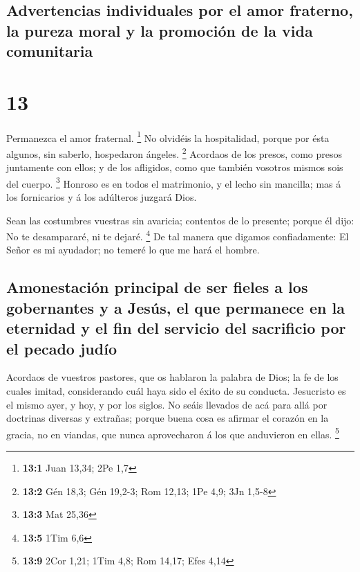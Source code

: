 \hypertarget{advertencias-individuales-por-el-amor-fraterno-la-pureza-moral-y-la-promociuxf3n-de-la-vida-comunitaria}{%
\subsection{Advertencias individuales por el amor fraterno, la pureza
moral y la promoción de la vida
comunitaria}\label{advertencias-individuales-por-el-amor-fraterno-la-pureza-moral-y-la-promociuxf3n-de-la-vida-comunitaria}}

\hypertarget{section-12}{%
\section{13}\label{section-12}}

 Permanezca el amor fraternal. \footnote{\textbf{13:1}
  Juan 13,34; 2Pe 1,7}  No olvidéis la hospitalidad,
porque por ésta algunos, sin saberlo, hospedaron ángeles. \footnote{\textbf{13:2}
  Gén 18,3; Gén 19,2-3; Rom 12,13; 1Pe 4,9; 3Jn 1,5-8} 
Acordaos de los presos, como presos juntamente con ellos; y de los
afligidos, como que también vosotros mismos sois del cuerpo. \footnote{\textbf{13:3}
  Mat 25,36}  Honroso es en todos el matrimonio, y el
lecho sin mancilla; mas á los fornicarios y á los adúlteros juzgará
Dios.

 Sean las costumbres vuestras sin avaricia; contentos de
lo presente; porque él dijo: No te desampararé, ni te dejaré.
\footnote{\textbf{13:5} 1Tim 6,6}  De tal manera que
digamos confiadamente: El Señor es mi ayudador; no temeré lo que me hará
el hombre.

\hypertarget{amonestaciuxf3n-principal-de-ser-fieles-a-los-gobernantes-y-a-jesuxfas-el-que-permanece-en-la-eternidad-y-el-fin-del-servicio-del-sacrificio-por-el-pecado-juduxedo}{%
\subsection{Amonestación principal de ser fieles a los gobernantes y a
Jesús, el que permanece en la eternidad y el fin del servicio del
sacrificio por el pecado
judío}\label{amonestaciuxf3n-principal-de-ser-fieles-a-los-gobernantes-y-a-jesuxfas-el-que-permanece-en-la-eternidad-y-el-fin-del-servicio-del-sacrificio-por-el-pecado-juduxedo}}

 Acordaos de vuestros pastores, que os hablaron la palabra
de Dios; la fe de los cuales imitad, considerando cuál haya sido el
éxito de su conducta.  Jesucristo es el mismo ayer, y hoy,
y por los siglos.  No seáis llevados de acá para allá por
doctrinas diversas y extrañas; porque buena cosa es afirmar el corazón
en la gracia, no en viandas, que nunca aprovecharon á los que anduvieron
en ellas. \footnote{\textbf{13:9} 2Cor 1,21; 1Tim 4,8; Rom 14,17; Efes
  4,14}

